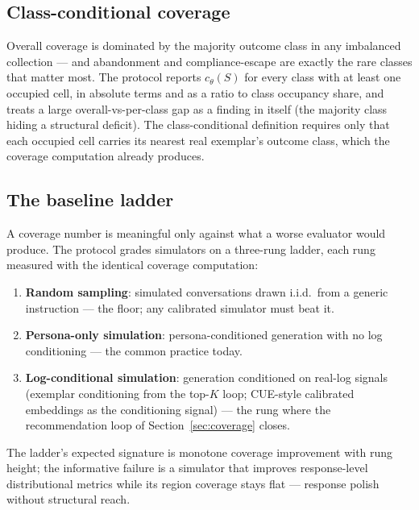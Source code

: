 \subsection{Class-conditional coverage}
Overall coverage is dominated by the majority outcome class in any imbalanced collection ---
and abandonment and compliance-escape are exactly the rare classes that matter most.
The protocol reports $c_\theta(S)$ for every class with at least one occupied cell, in
absolute terms and as a ratio to class occupancy share, and treats a large
overall-vs-per-class gap as a finding in itself (the majority class hiding a structural
deficit).
The class-conditional definition requires only that each occupied cell carries its nearest
real exemplar's outcome class, which the coverage computation already produces.

\subsection{The baseline ladder}
A coverage number is meaningful only against what a worse evaluator would produce.
The protocol grades simulators on a three-rung ladder, each rung measured with the identical
coverage computation:
\begin{enumerate}
  \item \textbf{Random sampling}: simulated conversations drawn i.i.d.\ from a generic
        instruction --- the floor; any calibrated simulator must beat it.
  \item \textbf{Persona-only simulation}: persona-conditioned generation with no log
        conditioning --- the common practice today.
  \item \textbf{Log-conditional simulation}: generation conditioned on real-log signals
        (exemplar conditioning from the top-$K$ loop; CUE-style calibrated embeddings
        \citep{cue2026} as the conditioning signal) --- the rung where the recommendation
        loop of Section~\ref{sec:coverage} closes.
\end{enumerate}
The ladder's expected signature is monotone coverage improvement with rung height; the
informative failure is a simulator that improves response-level distributional metrics
\citep{cds2026,distributionalGap2026} while its region coverage stays flat --- response
polish without structural reach.

